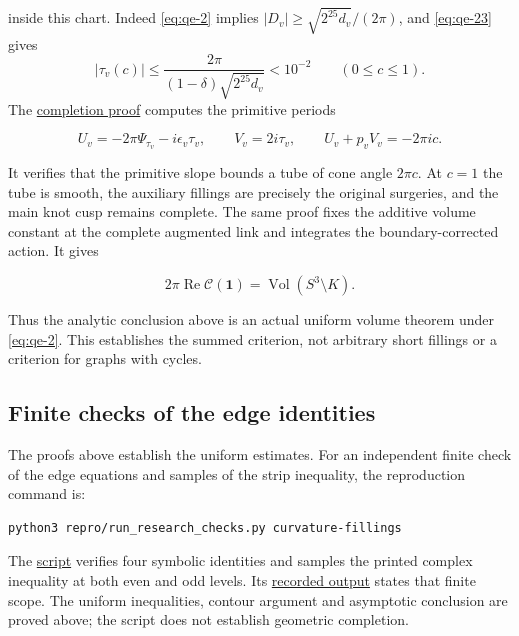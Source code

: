 inside this chart. Indeed \eqref{eq:qe-2} implies
$|D_v|\ge\sqrt{2^{25}d_v}/(2\pi)$, and \eqref{eq:qe-23} gives
\[
 |\tau_v(c)|\le\frac{2\pi}{(1-\delta)\sqrt{2^{25}d_v}}<10^{-2}
 \qquad(0\le c\le1).
\]
The \hyperref[sec:fg]{completion proof} computes the primitive periods

\[
 U_v=-2\pi\Psi_{\tau_v}-i\epsilon_v\tau_v,\qquad
 V_v=2i\tau_v,\qquad U_v+p_vV_v=-2\pi ic.
\]

It verifies that the primitive slope bounds a tube of cone angle \(2\pi c\). At \(c=1\) the tube is smooth, the auxiliary fillings are precisely the original surgeries, and the main knot cusp remains complete. The same proof fixes the additive volume constant at the complete augmented link and integrates the boundary-corrected action. It gives

\begin{equation}
2\pi\operatorname{Re}\mathcal C(\mathbf1)
             =\operatorname{Vol}(S^3\setminus K).
\label{eq:qe-38}
\end{equation}

Thus the analytic conclusion above is an actual uniform volume theorem under \eqref{eq:qe-2}. This establishes the summed criterion, not arbitrary short fillings or a criterion for graphs with cycles.

\subsection{Finite checks of the edge identities}\label{sec:qe-reproduction}

The proofs above establish the uniform estimates. For an independent
finite check of the edge equations and samples of the strip inequality,
the reproduction command is:

\begin{verbatim}
python3 repro/run_research_checks.py curvature-fillings
\end{verbatim}

The \href{https://github.com/sashakolpakov/murakamis_dream/blob/main/experiments/audit_all_circle_curvature_packet.py}{script} verifies four symbolic identities and samples the printed complex inequality at both even and odd levels. Its \href{https://github.com/sashakolpakov/murakamis_dream/blob/main/experiments/all_circle_curvature_packet_results.json}{recorded output} states that finite scope. The uniform inequalities, contour argument and asymptotic conclusion are proved above; the script does not establish geometric completion.

